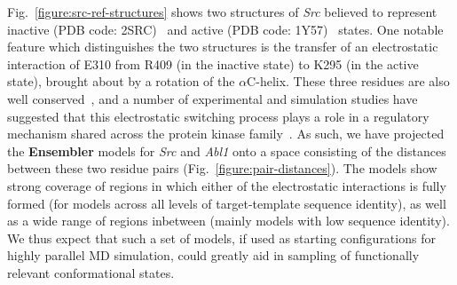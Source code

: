 \documentclass[aps,pre,twocolumn,nofootinbib,superscriptaddress,linenumbers]{revtex4-1}
\begin{document}
Fig.~\ref{figure:src-ref-structures} shows two structures of \emph{Src} believed to represent inactive (PDB code: 2SRC)~\cite{xu:1999:2src} and active (PDB code: 1Y57)~\cite{cowan-jacob:2005:1y57} states.
One notable feature which distinguishes the two structures is the transfer of an electrostatic interaction of E310 from R409 (in the inactive state) to K295 (in the active state), brought about by a rotation of the $\alpha$C-helix.
These three residues are also well conserved~\cite{kannan:jmb:2005:kinase-regulation}, and a number of experimental and simulation studies have suggested that this electrostatic switching process plays a role in a regulatory mechanism shared across the protein kinase family~\cite{shukla-pande:nature-commun:2014:src-activation-msm, foda:nat-comm:2015:src, ozkirimli:prot-sci:2008:src}.
As such, we have projected the {\bf Ensembler} models for \emph{Src} and \emph{Abl1} onto a space consisting of the distances between these two residue pairs (Fig.~\ref{figure:pair-distances}).
The models show strong coverage of regions in which either of the electrostatic interactions is fully formed (for models across all levels of target-template sequence identity), as well as a wide range of regions inbetween (mainly models with low sequence identity).
We thus expect that such a set of models, if used as starting configurations for highly parallel MD simulation, could greatly aid in sampling of functionally relevant conformational states.

\end{document}
